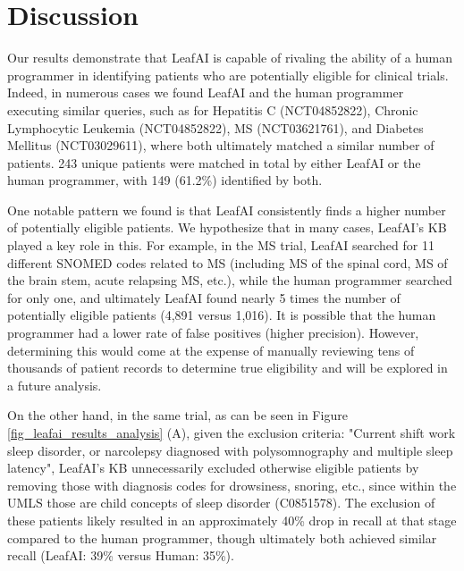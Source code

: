 \documentclass[../main.tex]{subfiles}
\begin{document}
\section{Discussion}

Our results demonstrate that LeafAI is capable of rivaling the ability of a human programmer in identifying patients who are potentially eligible for  clinical trials. Indeed, in numerous cases we found LeafAI and the human programmer executing similar queries, such as for Hepatitis C (NCT04852822), Chronic Lymphocytic Leukemia (NCT04852822), MS (NCT03621761), and Diabetes Mellitus (NCT03029611), where both ultimately matched a similar number of patients. 243 unique patients were matched in total by either LeafAI or the human programmer, with 149 (61.2\%) identified by both.

One notable pattern we found is that LeafAI consistently finds a higher number of potentially eligible patients. We hypothesize that in many cases, LeafAI’s KB played a key role in this. For example, in the MS trial, LeafAI searched for 11 different SNOMED codes related to MS (including MS of the spinal cord, MS of the brain stem, acute relapsing MS, etc.), while the human programmer searched for only one, and ultimately LeafAI found nearly 5 times the number of potentially eligible patients (4,891 versus 1,016). It is possible that the human programmer had a lower rate of false positives (higher precision). However, determining this would come at the expense of manually reviewing tens of thousands of patient records to determine true eligibility and will be explored in a future analysis.  

On the other hand, in the same trial, as can be seen in Figure \ref{fig_leafai_results_analysis} (A), given the exclusion criteria: "Current shift work sleep disorder, or narcolepsy diagnosed with polysomnography and multiple sleep latency", LeafAI’s KB unnecessarily excluded otherwise eligible patients by removing those with diagnosis codes for drowsiness, snoring, etc., since within the UMLS those are child concepts of sleep disorder (C0851578). The exclusion of these patients likely resulted in an approximately 40\% drop in recall at that stage compared to the human programmer, though ultimately both achieved similar recall (LeafAI: 39\% versus Human: 35\%).
\end{document}
